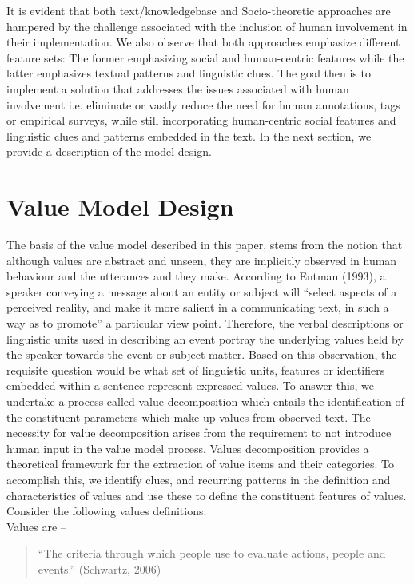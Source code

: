 It is evident that both text/knowledgebase and Socio-theoretic approaches are hampered by the challenge associated with the inclusion of human involvement in their implementation. We also observe that both approaches emphasize different feature sets: The former emphasizing social and human-centric features while the latter emphasizes textual patterns and linguistic clues. The goal then is to implement a solution that addresses the issues associated with human involvement i.e. eliminate or vastly reduce the need for human annotations, tags or empirical surveys, while still incorporating human-centric social features and linguistic clues and patterns embedded in the text. In the next section, we provide a description of the model design.

\section{Value Model Design}
The basis of the value model described in this paper, stems from the notion that although values are abstract and unseen, they are implicitly observed in human behaviour and the utterances and they make. According to Entman (1993), a speaker conveying a message about an entity or subject will ``select aspects of a perceived reality, and make it more salient in a communicating text, in such a way as to promote'' a particular view point. Therefore, the verbal descriptions or linguistic units used in describing an event portray the underlying values held by the speaker towards the event or subject matter. Based on this observation, the requisite question would be what set of linguistic units, features or identifiers embedded within a sentence represent expressed values. To answer this, we undertake a process called value decomposition which entails the identification of the constituent parameters which make up values from observed text. The necessity for value decomposition arises from the requirement to not introduce human input in the value model process. Values decomposition provides a theoretical framework for the extraction of value items and their categories. To accomplish this, we identify clues, and recurring patterns in the definition and characteristics of values and use these to define the constituent features of values. Consider the following values definitions.\\
Values are -- 
\begin{quotation}
``The criteria through which people use to evaluate actions, people and events.'' (Schwartz, 2006)
\end{quotation}
